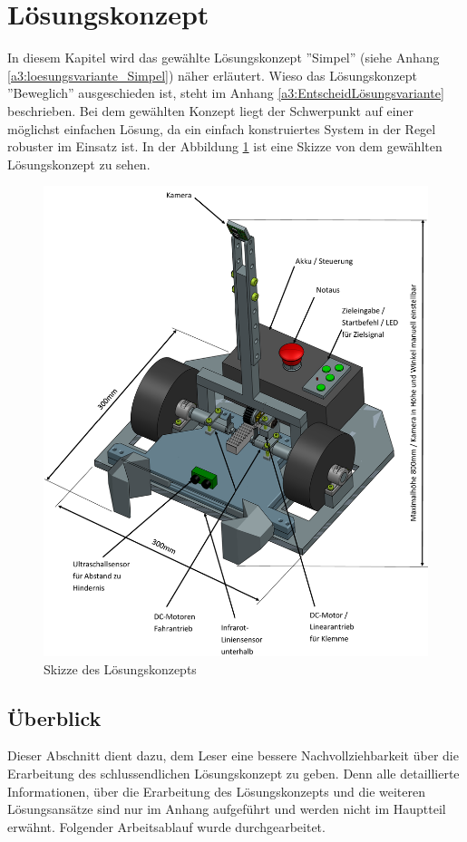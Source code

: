 \documentclass[../main.tex]{subfiles}
\begin{document}
\newpage
\section{Lösungskonzept}\label{lösungskonzept}

In diesem Kapitel wird das gewählte Lösungskonzept ''Simpel'' (siehe Anhang \ref{a3:loesungsvariante_Simpel}) näher erläutert. Wieso das Lösungskonzept ''Beweglich'' ausgeschieden ist, steht im Anhang \ref{a3:EntscheidLösungsvariante} beschrieben. Bei dem gewählten Konzept liegt der Schwerpunkt auf einer möglichst einfachen Lösung, da ein einfach konstruiertes System in der Regel robuster im Einsatz ist. In der Abbildung \ref{img:Konzept-Skizze_Fahrzeug} ist eine Skizze von dem gewählten Lösungskonzept zu sehen.

\begin{figure}[H]
\centering
\includegraphics[width=0.85\linewidth]{Skizze Konzept beschriftet.png}
\caption{Skizze des Lösungskonzepts}
\label{img:Konzept-Skizze_Fahrzeug}
\end{figure}

\newpage
\subsection{Überblick}
Dieser Abschnitt dient dazu, dem Leser eine bessere Nachvollziehbarkeit über die Erarbeitung des schlussendlichen Lösungskonzept zu geben.
Denn alle detaillierte Informationen, über die Erarbeitung des Lösungskonzepts und die weiteren Lösungsansätze sind nur im Anhang aufgeführt und werden nicht im Hauptteil erwähnt. Folgender Arbeitsablauf wurde durchgearbeitet.
\end{document}
